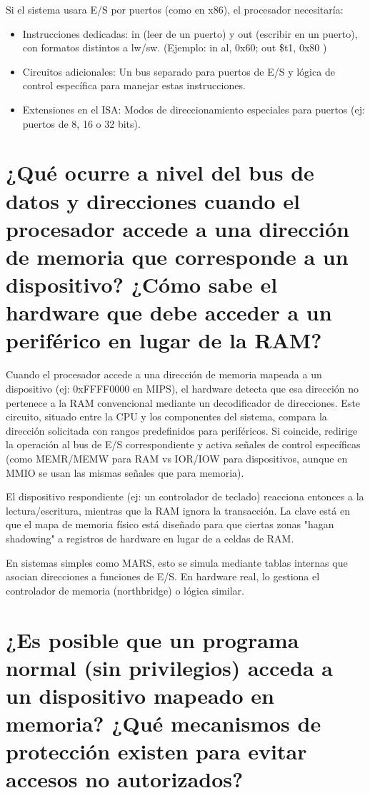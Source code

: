 \documentclass{article}
\begin{document}
Si el sistema usara E/S por puertos (como en x86), el procesador necesitaría:
\begin{itemize}
\item Instrucciones dedicadas: in (leer de un puerto) y out (escribir en un puerto), con formatos distintos a lw/sw. (Ejemplo: in al, 0x60; out \$t1, 0x80  )
\item Circuitos adicionales: Un bus separado para puertos de E/S y lógica de control específica para manejar estas instrucciones.
\item Extensiones en el ISA: Modos de direccionamiento especiales para puertos (ej: puertos de 8, 16 o 32 bits).
\end{itemize}

\section{¿Qué ocurre a nivel del bus de datos y direcciones cuando el procesador accede a una dirección de memoria que corresponde a un dispositivo? ¿Cómo sabe el hardware que debe acceder a un periférico en lugar de la RAM?}

Cuando el procesador accede a una dirección de memoria mapeada a un dispositivo (ej: 0xFFFF0000 en MIPS), el hardware detecta que esa dirección no pertenece a la RAM convencional mediante un decodificador de direcciones. Este circuito, situado entre la CPU y los componentes del sistema, compara la dirección solicitada con rangos predefinidos para periféricos. Si coincide, redirige la operación al bus de E/S correspondiente y activa señales de control específicas (como MEMR/MEMW para RAM vs IOR/IOW para dispositivos, aunque en MMIO se usan las mismas señales que para memoria). \newline

El dispositivo respondiente (ej: un controlador de teclado) reacciona entonces a la lectura/escritura, mientras que la RAM ignora la transacción. La clave está en que el mapa de memoria físico está diseñado para que ciertas zonas "hagan shadowing" a registros de hardware en lugar de a celdas de RAM. \newline

En sistemas simples como MARS, esto se simula mediante tablas internas que asocian direcciones a funciones de E/S. En hardware real, lo gestiona el controlador de memoria (northbridge) o lógica similar.


\section{¿Es posible que un programa normal (sin privilegios) acceda a un dispositivo mapeado en memoria? ¿Qué mecanismos de protección existen para evitar accesos no autorizados?}
\end{document}
